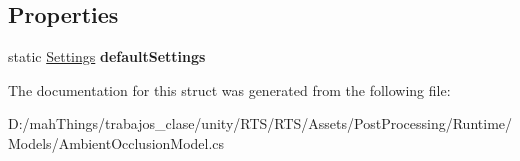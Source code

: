 \subsection*{Properties}
\begin{DoxyCompactItemize}
\item 
\mbox{\label{struct_unity_engine_1_1_post_processing_1_1_ambient_occlusion_model_1_1_settings_a1a2d8b2ae93f327b3365648d7abf25f1}} 
static \mbox{\hyperlink{struct_unity_engine_1_1_post_processing_1_1_ambient_occlusion_model_1_1_settings}{Settings}} {\bfseries default\+Settings}
\end{DoxyCompactItemize}


The documentation for this struct was generated from the following file\+:\begin{DoxyCompactItemize}
\item 
D\+:/mah\+Things/trabajos\+\_\+clase/unity/\+R\+T\+S/\+R\+T\+S/\+Assets/\+Post\+Processing/\+Runtime/\+Models/Ambient\+Occlusion\+Model.\+cs\end{DoxyCompactItemize}
